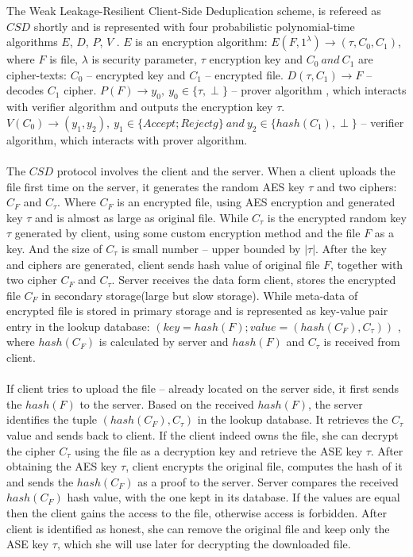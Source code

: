 \documentclass[12pt]{article}
\begin{document}
The Weak Leakage-Resilient Client-Side Deduplication scheme, is refereed as $CSD$ shortly and is represented with four probabilistic polynomial-time algorithms $E$, $D$, $P$, $V$ .  $E$ is an encryption algorithm: $E(F,1^\lambda) 	\rightarrow (\tau, C_0, C_1)$, where $F$ is file, $\lambda$ is security parameter, $\tau$ encryption key and $C_0\ and\ C_1$ are cipher-texts: $C_0$ -- encrypted key and $C_1$ -- encrypted file. $D(\tau,C_1) \rightarrow F $ -- decodes $C_1$ cipher. $P(F) \rightarrow y_0,\  y_0 \in \{\tau,\perp\} $ -- prover algorithm , which interacts with verifier algorithm and outputs the encryption key $\tau$. $V(C_0) \rightarrow (y_1,y_2),\ y_1 \in \{Accept; Rejectg\}\ and\ y_2 \in \{hash(C_1),\perp \}$ -- verifier algorithm, which interacts with prover algorithm.\\\\
The $CSD$ protocol involves the client and the server. When a client uploads the file first time on the server, it generates the random AES\cite{AES} key $\tau$ and two ciphers: $C_F$ and $C_\tau$. Where $C_F$ is an encrypted file, using AES encryption and generated  key $\tau$  and is almost as large as original file. While  $C_\tau$ is the encrypted random key $\tau$ generated by client, using some custom encryption method and the file $F$ as a key. And the size of $C_\tau$ is small number -- upper bounded by $|\tau|$. After the key and ciphers are generated, client sends hash value of original file $F$, together with two cipher $C_F$ and $C_\tau$.  Server receives the data form client, stores the encrypted file $C_F$ in secondary storage(large but slow storage). While meta-data of encrypted file is stored in primary storage and is represented as key-value pair entry in the lookup database: $(key = hash(F); value = (hash(C_F), C_\tau))$ , where $hash(C_F)$ is calculated by server and $hash(F)$ and $C_\tau$ is received from client.\\\\
If client tries to upload the file -- already located on the server side, it first sends the $hash(F)$ to the server.  Based on the received $hash(F)$, the server identifies  the tuple $(hash(C_F),C_\tau)$ in the lookup database. It retrieves the $C_\tau$ value and sends back to client. If the client indeed owns the file, she can decrypt the cipher $C_\tau$ using the file as a decryption key and retrieve the ASE key $\tau$. After obtaining the AES key $\tau$, client encrypts the original file, computes the hash of it and sends the $hash(C_F)$ as a proof to the server. Server compares the received $hash(C_F)$ hash value, with the one kept in its database. If the values are equal then the client gains the access to the file, otherwise access is forbidden. After client is identified as honest, she can remove the original file and keep only the ASE key $\tau$, which she will use later for decrypting the downloaded file.\\\\
\end{document}
